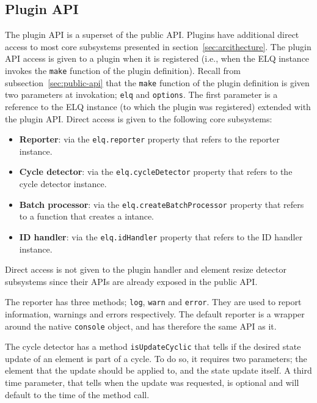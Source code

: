 \documentclass[a4paper,11pt]{kth-mag}
\newcommand{\code}[1]{\texttt{#1}}
\newcommand\abbr[2][]{\uppercase{#2}\ifthenelse{\equal{#1}{}}%
                     {}{#1}}
\begin{document}
        \subsection{Plugin API}
          The plugin \gls{API} is a superset of the public \gls{API}.
          Plugins have additional direct access to most core subsystems presented in section~\ref{sec:arcithecture}.
          The plugin \gls{API} access is given to a plugin when it is registered (i.e., when the \abbr{elq} instance invokes the \code{make} function of the plugin definition).
          Recall from subsection~\ref{sec:public-api} that the \code{make} function of the plugin definition is given two parameters at invokation; \code{elq} and \code{options}.
          The first parameter is a reference to the \abbr{ELQ} instance (to which the plugin was registered) extended with the plugin \gls{API}.
          Direct access is given to the following core subsystems:
          \begin{itemize}
            \item \textbf{Reporter}: via the \code{elq.reporter} property that refers to the reporter instance.
            \item \textbf{Cycle detector}: via the \code{elq.cycleDetector} property that refers to the cycle detector instance.
            \item \textbf{Batch processor}: via the \code{elq.createBatchProcessor} property that refers to a function that creates a  intance.
            \item \textbf{\abbr{ID} handler}: via the \code{elq.idHandler} property that refers to the \abbr{ID} handler instance. 
          \end{itemize}
          Direct access is not given to the plugin handler and element resize detector subsystems since their \glspl{API} are already exposed in the public \gls{API}.

          The reporter has three methods; \code{log}, \code{warn} and \code{error}.
          They are used to report information, warnings and errors respectively.
          The default reporter is a wrapper around the native \code{console} object, and has therefore the same \gls{API} as it.

          The cycle detector has a method \code{isUpdateCyclic} that tells if the desired state update of an element is part of a cycle.
          To do so, it requires two parameters; the element that the update should be applied to, and the state update itself.
          A third time parameter, that tells when the update was requested, is optional and will default to the time of the method call.
\end{document}
